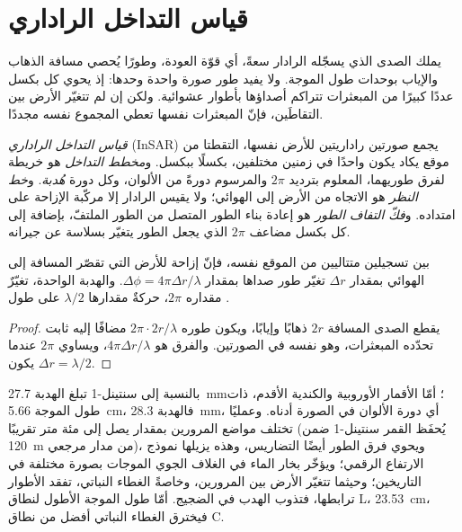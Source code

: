 \section{قياس التداخل الراداري}\label{sec:b3:remote-sensing-gis:insar}

يملك الصدى الذي يسجّله الرادار سعةً، أي قوّة العودة،
وطورًا يُحصي مسافة الذهاب والإياب بوحدات
طول الموجة. ولا يفيد طور صورة واحدة وحدها: إذ يحوي كل بكسل عددًا كبيرًا من المبعثرات
تتراكم أصداؤها بأطوار عشوائية. ولكن إن لم تتغيّر الأرض بين التقاطَين،
فإنّ المبعثرات نفسها تعطي المجموع نفسه مجددًا.

\begin{definition}\label{def:b3:remote-sensing-gis:insar}
\emph{قياس التداخل الراداري} (InSAR) يجمع
صورتين راداريتين للأرض نفسها، التقطتا من موقع يكاد يكون واحدًا
في زمنين مختلفين، بكسلًا ببكسل. و\emph{مخطط التداخل}
هو خريطة لفرق طوريهما، المعلوم بترديد $2\pi$
والمرسوم دورةً من الألوان، وكل دورة \emph{هُدبة}. و\emph{خط
النظر} هو الاتجاه من الأرض إلى
الهوائي؛ ولا يقيس الرادار إلا مركّبة الإزاحة على
امتداده. و\emph{فكّ التفاف الطور} هو إعادة بناء
الطور المتصل من الطور الملتفّ، بإضافة إلى كل بكسل
مضاعف $2\pi$ الذي يجعل الطور يتغيّر بسلاسة عن جيرانه.
\end{definition}

\begin{theorem}\label{thm:b3:remote-sensing-gis:fringe}
بين تسجيلين متتاليين من الموقع نفسه، فإنّ إزاحة للأرض
التي تقصّر المسافة إلى الهوائي بمقدار $\Delta r$ تغيّر
طور صداها بمقدار $\Delta\phi = 4\pi\Delta r/\lambda$. والهدبة الواحدة، تغيّرٌ
مقداره $2\pi$، حركةٌ مقدارها $\lambda/2$ على طول .
\end{theorem}

\begin{proof}
يقطع الصدى المسافة $2r$ ذهابًا وإيابًا، ويكون طوره
$2\pi\cdot 2r/\lambda$ مضافًا إليه ثابت تحدّده المبعثرات، وهو نفسه في
الصورتين. والفرق هو $4\pi\Delta r/\lambda$، ويساوي $2\pi$
عندما يكون $\Delta r = \lambda/2$.
\end{proof}

بالنسبة إلى سنتينل-1 تبلغ الهدبة \qty{27.7}{mm}؛ أمّا الأقمار
الأوروبية والكندية الأقدم، ذات طول الموجة \qty{5.66}{cm}، فالهدبة \qty{28.3}{mm}، أي
دورة الألوان في الصورة أدناه. وعمليًا تختلف مواضع المرورين
بمقدار يصل إلى مئة متر تقريبًا (يُحفَظ القمر سنتينل-1
ضمن \qty{120}{m} من مدار مرجعي)، ويحوي فرق الطور أيضًا
التضاريس، وهذه يزيلها نموذج الارتفاع الرقمي؛
ويؤخّر بخار الماء في الغلاف الجوي الموجات بصورة مختلفة في التاريخين؛
وحيثما تتغيّر الأرض بين المرورين، وخاصةً الغطاء النباتي،
تفقد الأطوار ترابطها، فتذوب الهدب في الضجيج. أمّا طول الموجة
الأطول لنطاق L، \qty{23.53}{cm}، فيخترق الغطاء النباتي أفضل من
نطاق C.

